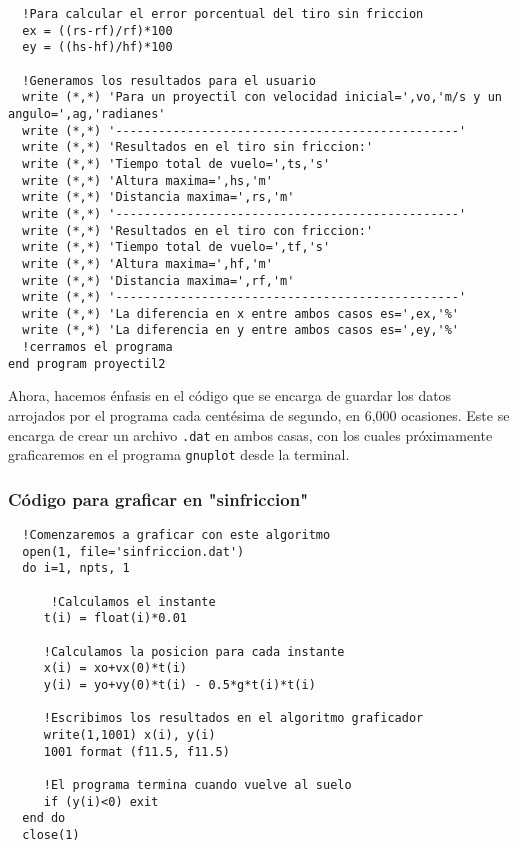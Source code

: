 \documentclass[a4paper]{article}
\begin{document}
\begin{verbatim}
  !Para calcular el error porcentual del tiro sin friccion
  ex = ((rs-rf)/rf)*100
  ey = ((hs-hf)/hf)*100

  !Generamos los resultados para el usuario
  write (*,*) 'Para un proyectil con velocidad inicial=',vo,'m/s y un angulo=',ag,'radianes'
  write (*,*) '------------------------------------------------'  
  write (*,*) 'Resultados en el tiro sin friccion:'
  write (*,*) 'Tiempo total de vuelo=',ts,'s'
  write (*,*) 'Altura maxima=',hs,'m'
  write (*,*) 'Distancia maxima=',rs,'m'
  write (*,*) '------------------------------------------------'  
  write (*,*) 'Resultados en el tiro con friccion:'
  write (*,*) 'Tiempo total de vuelo=',tf,'s'
  write (*,*) 'Altura maxima=',hf,'m'
  write (*,*) 'Distancia maxima=',rf,'m'
  write (*,*) '------------------------------------------------'  
  write (*,*) 'La diferencia en x entre ambos casos es=',ex,'%'
  write (*,*) 'La diferencia en y entre ambos casos es=',ey,'%'
  !cerramos el programa   
end program proyectil2

\end{verbatim}

Ahora, hacemos énfasis en el código que se encarga de guardar los datos arrojados por el programa cada centésima de segundo, en 6,000 ocasiones. Este se encarga de crear un archivo \texttt{.dat} en ambos casas, con los cuales próximamente graficaremos en el programa \texttt{gnuplot} desde la terminal.

\subsubsection{Código para graficar en "sinfriccion"}
\begin{verbatim}
  !Comenzaremos a graficar con este algoritmo   
  open(1, file='sinfriccion.dat')   
  do i=1, npts, 1

      !Calculamos el instante
     t(i) = float(i)*0.01 
     
     !Calculamos la posicion para cada instante     
     x(i) = xo+vx(0)*t(i)   
     y(i) = yo+vy(0)*t(i) - 0.5*g*t(i)*t(i)   

     !Escribimos los resultados en el algoritmo graficador   
     write(1,1001) x(i), y(i)
     1001 format (f11.5, f11.5)

     !El programa termina cuando vuelve al suelo   
     if (y(i)<0) exit   
  end do
  close(1)
\end{verbatim}  
\end{document}
